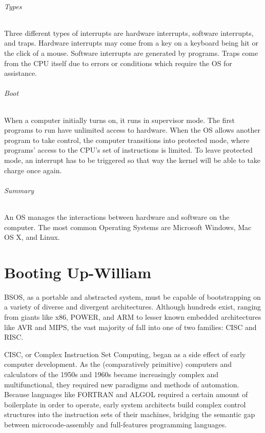 \documentclass[english]{article}
\begin{document}
\paragraph{Types}
Three different types of interrupts are hardware interrupts, software interrupts, and traps. Hardware interrupts may come from a key on a keyboard being hit or the click of a mouse. Software interrupts are generated by programs. Traps come from the CPU itself due to errors or conditions which require the OS for assistance.

\paragraph{Boot}
When a computer initially turns on, it runs in supervisor mode. The first programs to run have unlimited access to hardware. When the OS allows another program to take control, the computer transitions into protected mode, where programs' access to the CPU's set of instructions is limited. To leave protected mode, an interrupt has to be triggered so that way the kernel will be able to take charge once again.

\paragraph{Summary}
An OS manages the interactions between hardware and software on the computer. The most common Operating Systems are Microsoft Windows, Mac OS X, and Linux.

\part{Booting Up-William}
BSOS, as a portable and abstracted system, must be capable of bootstrapping on a variety of diverse and divergent architectures. Although hundreds exist, ranging from giants like x86, POWER, and ARM to lesser known embedded architectures like AVR and MIPS, the vast majority of fall into one of two families: CISC and RISC.

CISC, or Complex Instruction Set Computing, began as a side effect of early computer development. As the (comparatively primitive) computers and calculators of the 1950s and 1960s became increasingly complex and multifunctional, they required new paradigms and methods of automation. Because languages like FORTRAN and ALGOL required a certain amount of boilerplate in order to operate, early system architects build complex control structures into the instruction sets of their machines, bridging the semantic gap between microcode-assembly and full-features programming languages.
\end{document}
